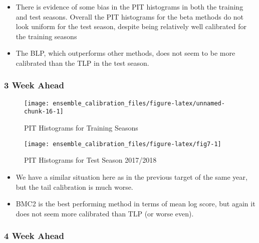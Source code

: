 \documentclass[
]{article}
\begin{document}
\begin{itemize}
\item There is evidence of some bias in the PIT histograms in both the training and test seasons. Overall the PIT histograms for the beta methods do not look uniform for the test season, despite being relatively well calibrated for the training seasons
\item The BLP, which outperforms other methods, does not seem to be more calibrated than the TLP in the test season.
\end{itemize}

\newpage

\hypertarget{week-ahead-6}{%
\subsubsection{3 Week Ahead}\label{week-ahead-6}}

\begin{figure}[H]

{\centering \texttt{[image: ensemble\_calibration\_files/figure-latex/unnamed-chunk-16-1]} 

}

\caption{PIT Histograms for Training Seasons}\label{fig:unnamed-chunk-16}
\end{figure}

\newpage

\begin{figure}[H]

{\centering \texttt{[image: ensemble\_calibration\_files/figure-latex/fig7-1]} 

}

\caption{PIT Histograms for Test Season 2017/2018}\label{fig:fig7}
\end{figure}

\begin{itemize}
\item We have a similar situation here as in the previous target of the same year, but the tail calibration is much worse.
\item BMC2 is the best performing method in terms of mean log score, but again it does not seem more calibrated than TLP (or worse even).
\end{itemize}

\newpage

\hypertarget{week-ahead-7}{%
\subsubsection{4 Week Ahead}\label{week-ahead-7}}
\end{document}
